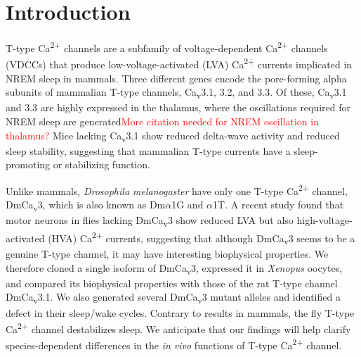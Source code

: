 \section*{Introduction}

T-type Ca\textsuperscript{2+} channels are a subfamily of voltage-dependent Ca\textsuperscript{2+} channels (VDCCs) that produce low-voltage-activated (LVA) Ca\textsuperscript{2+} currents implicated in NREM sleep in mammals\cite{Lee:2004ey}.
Three different genes encode the pore-forming alpha subunits of mammalian T-type channels, Ca\textsubscript{v}3.1, 3.2, and 3.3. Of these, Ca\textsubscript{v}3.1 and 3.3 are highly expressed in the thalamus, where the oscillations required for NREM sleep are generated\cite{PerezReyes:1998gn}\textcolor{red}{More citation needed for NREM oscillation in thalamus?}
Mice lacking Ca\textsubscript{v}3.1 show reduced delta-wave activity and reduced sleep stability, suggesting that mammalian T-type currents have a sleep-promoting or stabilizing function\cite{Lee:2004ey}.

Unlike mammals, \emph{Drosophila melanogaster} have only one T-type Ca\textsuperscript{2+} channel, DmCa\textsubscript{v}3, which is also known as Dm$\alpha$1G and $\alpha$1T.
A recent study found that motor neurons in flies lacking DmCa\textsubscript{v}3 show reduced LVA but also high-voltage-activated (HVA) Ca\textsuperscript{2+} currents, suggesting that although DmCa\textsubscript{v}3 seems to be a genuine T-type channel, it may have interesting biophysical properties\cite{Ryglewski:2012jk}.
We therefore cloned a single isoform of DmCa\textsubscript{v}3,  expressed it in \emph{Xenopus} oocytes, and compared its biophysical properties with those of the rat T-type channel DmCa\textsubscript{v}3.1.
We also generated several DmCa\textsubscript{v}3 mutant alleles and identified a defect in their sleep/wake cycles. Contrary to results in mammals, the fly T-type Ca\textsuperscript{2+} channel destabilizes sleep.
We anticipate that our findings will help clarify species-dependent differences in the \emph{in vivo} functions of T-type Ca\textsuperscript{2+} channel.
    
    
  
  
  
